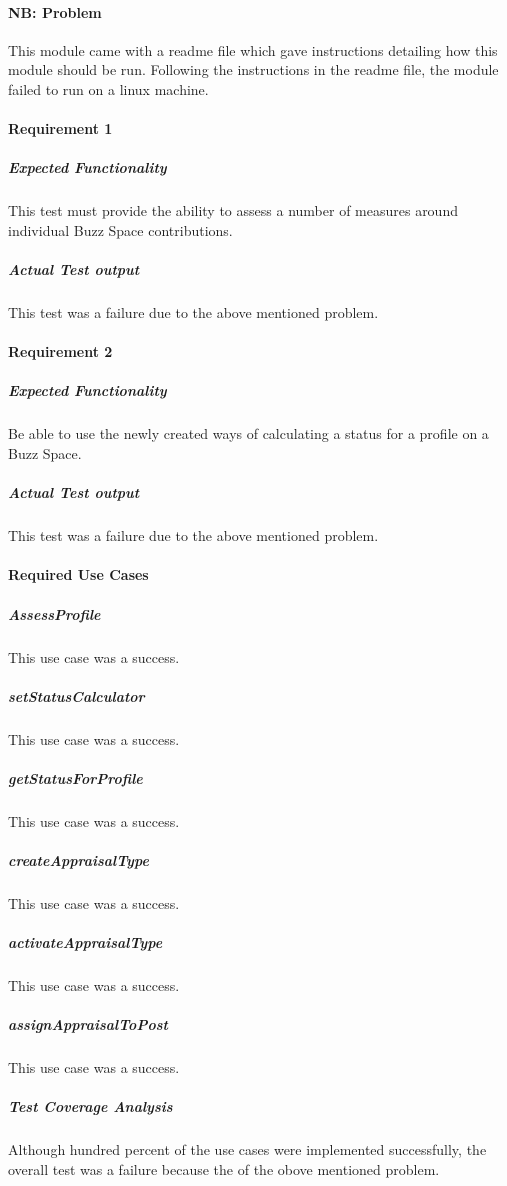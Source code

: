 \paragraph{NB: Problem}
	This module came with a readme file which gave instructions detailing how this module should be run.
	Following the instructions in the readme file, the module failed to run on a linux machine. 
	
\paragraph{Requirement 1}
	\subparagraph{Expected Functionality}
	This test must provide the ability to assess a number of measures around individual Buzz Space contributions.
	
	\subparagraph{Actual Test output}
	This test was a failure due to the above mentioned problem.

\paragraph{Requirement 2}
	\subparagraph{Expected Functionality}
	Be able to use the newly created ways of calculating a status for a profile on a Buzz Space.
	
	\subparagraph{Actual Test output}
	 This test was a failure due to the above mentioned problem.

\paragraph{Required Use Cases}
	\subparagraph{AssessProfile}
	This use case was a success.

	\subparagraph{setStatusCalculator}
	This use case was a success.	

	\subparagraph{getStatusForProfile}
	This use case was a success.
	
	\subparagraph{createAppraisalType}
	This use case was a success.
	
	\subparagraph{activateAppraisalType}
	This use case was a success.

	\subparagraph{assignAppraisalToPost}
	This use case was a success.

	\subparagraph{Test Coverage Analysis}
	Although hundred percent of the use cases were implemented successfully, the overall test was a failure because
	the of the obove mentioned problem.

	
